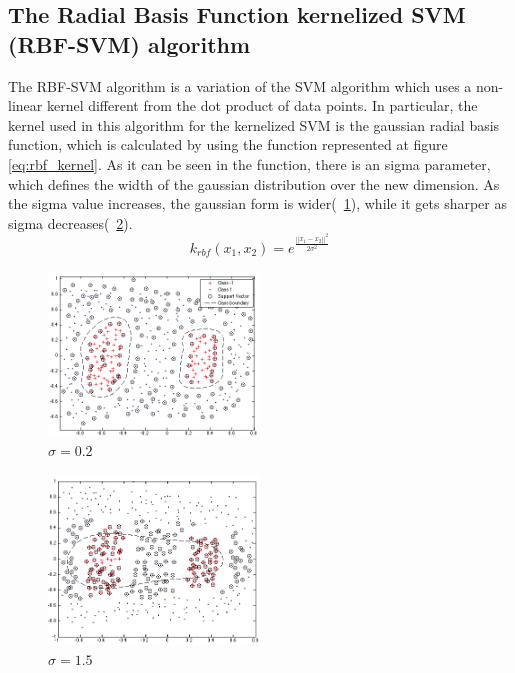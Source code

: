 \documentclass[10pt, journal]{IEEEtran}
\begin{document}
\subsection{The Radial Basis Function kernelized SVM (RBF-SVM) algorithm} %
\label{sub:the_radial_basis_function_kernelized_svm_rbf_svm_algorithm}

The RBF-SVM algorithm is a variation of the SVM algorithm which uses a non-linear kernel different from the dot product of data points. In particular, the kernel used in this algorithm for the kernelized SVM is the gaussian radial basis function, which is calculated by using the function represented at figure \ref{eq:rbf_kernel}. As it can be seen in the function, there is an sigma parameter, which defines the width of the gaussian distribution over the new dimension. As the sigma value increases, the gaussian form is wider(~\ref{fig:toySigma0P2}), while it gets sharper as sigma decreases(~\ref{fig:toySigma1P5}).\\
\begin{equation}
	k_{rbf}(x_1,x_2) = e^\frac{||x_1-x_2||^2}{2\sigma^2}
	\label{eq:rbf_kernel}
\end{equation}
\begin{figure}[ht!]
	\centering
	\includegraphics[width=0.5\textwidth]{img/toySigma0P2}
	\caption{$\sigma = 0.2$}
	\label{fig:toySigma0P2}
\end{figure}

\begin{figure}[ht!]
	\centering
	\includegraphics[width=0.5\textwidth]{img/toySigma1P5}
	\caption{$\sigma = 1.5$}
	\label{fig:toySigma1P5}
\end{figure}
\end{document}
